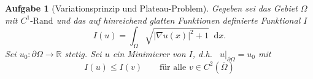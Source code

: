 \documentclass{scrartcl}
\newcommand{\abs}[1]{\left\lvert #1 \right\rvert}
\newcommand{\restr}[2]{\left. #1 \right|_{#2}}
\newcommand{\intd}{\mathop{} \mathrm{d}}
\newcommand{\Rand}[1]{\partial #1}
\newcommand{\reals}{\mathbb{R}}
\newcommand{\closure}[1]{\overline{#1}}
\newtheorem {problem} {Aufgabe}
\theoremstyle{remark}
\begin{document}
\begin{problem}[Variationsprinzip und Plateau-Problem]
  Gegeben sei das Gebiet
  $\Omega$ mit
  $C^1\text{-Rand}$ und das auf hinreichend glatten Funktionen definierte Funktional $I$
  \begin{equation}
    I(u) = \int_{\Omega}
    \sqrt
    { \abs{ \nabla u (x) } ^ 2 + 1}
    \intd x.
  \end{equation}
  Sei $u_0 \colon \Rand{\Omega} \to
  \reals$ stetig.
  Sei $u$ ein Minimierer von $I$, d.h.\ 
  $\restr{u}{\Rand {\Omega}} = u_0$ mit
  \begin{equation}
    I(u) \leq I(v)
    \qquad
    \text{für alle } v
    \in
    C^2(\closure{\Omega})

\end{equation}
\end{problem}
\end{document}

